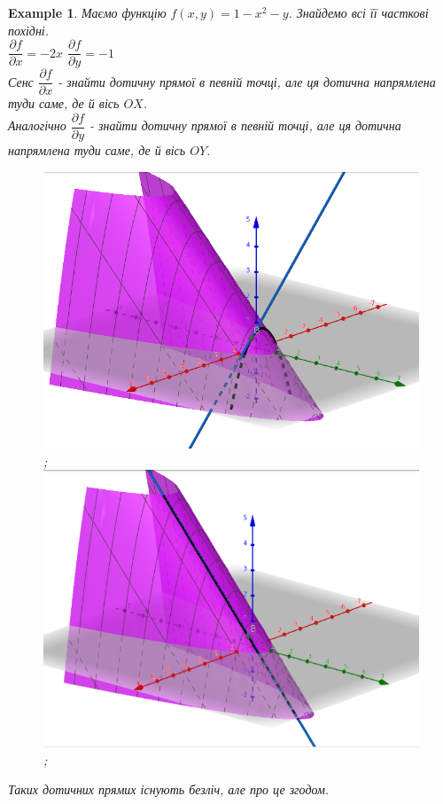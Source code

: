 \documentclass[a4paper, 10pt]{article}
\def\departial#1#2{\dfrac{\partial {#1}}{\partial {#2}}}
\theoremstyle{theoremdd}
\theoremstyle{theoremdd}
\theoremstyle{theoremdd}
\theoremstyle{theoremdd}
\newtheorem{example}[theorem]{Example}
\theoremstyle{theoremdd}
\theoremstyle{theoremdd}
\theoremstyle{theoremdd}
\theoremstyle{theoremdd}
\begin{document}
\begin{example}
Маємо функцію $f(x,y) = 1 - x^2 - y$. Знайдемо всі її часткові похідні.\\
$\departial{f}{x} = -2x$ \hspace{2cm} $\departial{f}{y} = -1$
\bigskip \\
Сенс $\departial{f}{x}$ - знайти дотичну прямої в певній точці, але ця дотична напрямлена туди саме, де й вісь $OX$.\\
Аналогічно $\departial{f}{y}$ - знайти дотичну прямої в певній точці, але ця дотична напрямлена туди саме, де й вісь $OY$.
\begin{figure}[H]
\centering
\includegraphics[scale=0.24]{tangent.png};
\qquad
\includegraphics[scale=0.24]{tangent2.png};
\end{figure}
Таких дотичних прямих існують безліч, але про це згодом.
\end{example}
\end{document}
